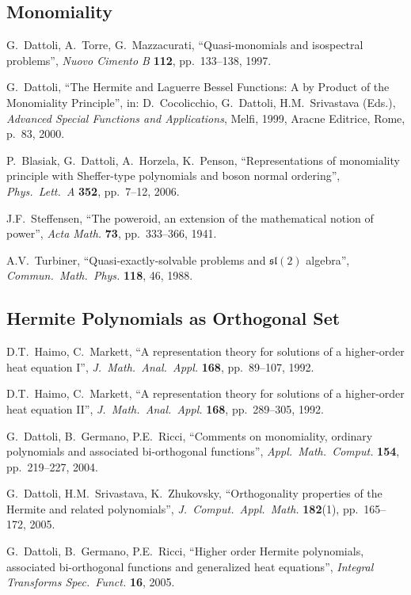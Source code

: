 \subsection*{Monomiality}
\begin{enumerate}[label={[\arabic*]},start=10]
\item G.~Dattoli, A.~Torre, G.~Mazzacurati,
      ``Quasi-monomials and isospectral problems'',
      \emph{Nuovo Cimento B} \textbf{112}, pp.~133--138, 1997.
\item G.~Dattoli, ``The Hermite and Laguerre Bessel Functions:
      A by Product of the Monomiality Principle'', in:
      D.~Cocolicchio, G.~Dattoli, H.M.~Srivastava (Eds.),
      \emph{Advanced Special Functions and Applications},
      Melfi, 1999, Aracne Editrice, Rome, p.~83, 2000.
\item P.~Blasiak, G.~Dattoli, A.~Horzela, K.~Penson,
      ``Representations of monomiality principle with
      Sheffer-type polynomials and boson normal ordering'',
      \emph{Phys.\ Lett.\ A} \textbf{352}, pp.~7--12, 2006.
\item J.F.~Steffensen, ``The poweroid, an extension of the
      mathematical notion of power'',
      \emph{Acta Math.} \textbf{73}, pp.~333--366, 1941.
\item A.V.~Turbiner, ``Quasi-exactly-solvable problems and
      $\mathfrak{sl}(2)$ algebra'',
      \emph{Commun.\ Math.\ Phys.} \textbf{118}, 46, 1988.
\end{enumerate}

\subsection*{Hermite Polynomials as Orthogonal Set}
\begin{enumerate}[label={[\arabic*]},start=15]
\item D.T.~Haimo, C.~Markett, ``A representation theory for
      solutions of a higher-order heat equation I'',
      \emph{J.\ Math.\ Anal.\ Appl.} \textbf{168},
      pp.~89--107, 1992.
\item D.T.~Haimo, C.~Markett, ``A representation theory for
      solutions of a higher-order heat equation II'',
      \emph{J.\ Math.\ Anal.\ Appl.} \textbf{168},
      pp.~289--305, 1992.
\item G.~Dattoli, B.~Germano, P.E.~Ricci,
      ``Comments on monomiality, ordinary polynomials and
      associated bi-orthogonal functions'',
      \emph{Appl.\ Math.\ Comput.} \textbf{154},
      pp.~219--227, 2004.
\item G.~Dattoli, H.M.~Srivastava, K.~Zhukovsky,
      ``Orthogonality properties of the Hermite and related
      polynomials'',
      \emph{J.\ Comput.\ Appl.\ Math.} \textbf{182}(1),
      pp.~165--172, 2005.
\item G.~Dattoli, B.~Germano, P.E.~Ricci,
      ``Higher order Hermite polynomials, associated
      bi-orthogonal functions and generalized heat
      equations'',
      \emph{Integral Transforms Spec.\ Funct.} \textbf{16},
      2005.
\end{enumerate}


